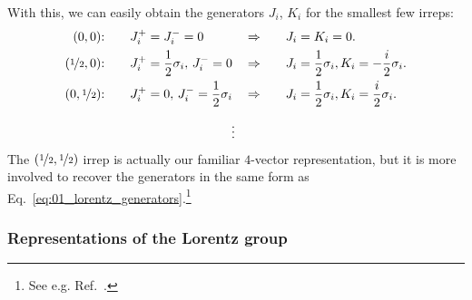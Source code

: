 With this, we can easily obtain the generators $J_i$, $K_i$ for the smallest few irreps:
\begin{align}
	\label{eq:01_lorentz_irreps_00}
	(0, 0)\text{:}& \qquad J^+_i = J^-_i = 0 \! &\Rightarrow& \qquad J_i = K_i = 0. \\
	\label{eq:01_lorentz_irreps_weyl_left}
	(\cnicefrac{1}{2}, 0)\text{:}& \qquad J^+_i = \frac{1}{2} \sigma_i,\, J^-_i = 0 \! &\Rightarrow& \qquad J_i = \frac{1}{2} \sigma_i, K_i = -\frac{i}{2} \sigma_i. \\
	\label{eq:01_lorentz_irreps_weyl_right}
	(0, \cnicefrac{1}{2})\text{:}& \qquad J^+_i = 0,\, J^-_i = \frac{1}{2} \sigma_i \! &\Rightarrow& \qquad J_i = \frac{1}{2} \sigma_i, K_i = \frac{i}{2} \sigma_i. \\[2mm]
	& \qquad\qquad\qquad\qquad\qquad \vdots \notag
	\vspace{-10mm}
\end{align}
The $(\cnicefrac{1}{2}, \cnicefrac{1}{2})$ irrep is actually our familiar $4$-vector representation, but it is more involved to recover the generators in the same form as Eq.~\ref{eq:01_lorentz_generators}.\footnote{See e.g. Ref.~\cite{439080}.}


\subsubsection{Representations of the Lorentz group}


